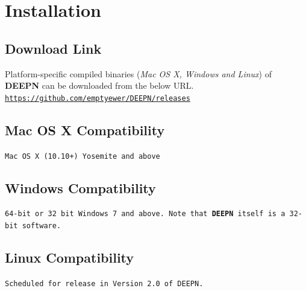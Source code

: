 \documentclass[11pt,fleqn]{book} %
\newcommand{\DEEPN}{\textbf{DEEPN }}
\begin{document}

\section{Installation}
\subsection{Download Link}\label{download link}

    Platform-specific compiled binaries (\emph{Mac OS X, Windows and Linux}) of \textbf{DEEPN} can be downloaded from the below URL. \\

    \texttt{\href{https://github.com/emptyewer/DEEPN/releases}{https://github.com/emptyewer/DEEPN/releases}}

    \subsection{Mac OS X Compatibility}\label{mac_install}

    \texttt{Mac OS X (10.10+) Yosemite and above}

    \subsection{Windows Compatibility}\label{windows_install}

    \texttt{64-bit or 32 bit Windows 7 and above. Note that \DEEPN itself is a 32-bit software.}

    \subsection{Linux Compatibility}\label{linux_install}

    \texttt{Scheduled for release in Version 2.0 of DEEPN.}

\clearpage
\end{document}
